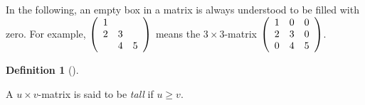 \documentclass[numbers=enddot,12pt,final,onecolumn,notitlepage]{scrartcl}%
\theoremstyle{definition}
\newtheorem{defi}[theo]{Definition}
\newenvironment{definition}[1][]
{\begin{defi}[#1]\begin{leftbar}}
{\end{leftbar}\end{defi}}
\renewcommand{\geq}{\geqslant}
\theoremstyle{plainsl}
\begin{document}
In the following, an empty box in a matrix is always understood to be filled
with zero. For example, $\left(
\begin{array}
[c]{ccc}%
1 &  & \\
2 & 3 & \\
& 4 & 5
\end{array}
\right)  $ means the $3\times3$-matrix $\left(
\begin{array}
[c]{ccc}%
1 & 0 & 0\\
2 & 3 & 0\\
0 & 4 & 5
\end{array}
\right)  $.

\begin{definition}
A $u\times v$-matrix is said to be \emph{tall} if $u\geq v$.
\end{definition}
\end{document}
